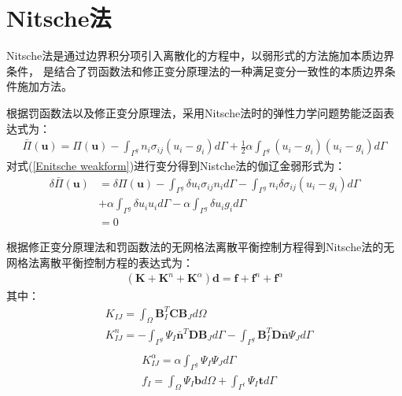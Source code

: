 \section{Nitsche法}
Nitsche法\cite{}是通过边界积分项引入离散化的方程中，以弱形式的方法施加本质边界条件，
是结合了罚函数法和修正变分原理法的一种满足变分一致性的本质边界条件施加方法。\par
根据罚函数法以及修正变分原理法，采用Nitsche法时的弹性力学问题势能泛函表达式为：
\begin{equation}\label{Enitsche weakform}
\begin{split}
    \bar{\Pi}(\pmb{u})=\Pi(\pmb{u})-\int_{\Gamma^g}n_i\sigma_{ij}(u_i-g_i)d\Gamma+\frac{1}{2}\alpha\int_{\Gamma^g}(u_i-g_i)(u_i-g_i)d\Gamma
\end{split}
\end{equation}
对式(\ref{Enitsche weakform})进行变分得到Nistche法的伽辽金弱形式为：
\begin{equation}
\begin{split}
    \delta\bar{\Pi}(\pmb{u})&=\delta\Pi(\pmb{u})-\int_{\Gamma^g}\delta u_i\sigma_{ij}n_id\Gamma-\int_{\Gamma^g}n_i\delta\sigma_{ij}(u_i-g_i)d\Gamma\\
&+\alpha\int_{\Gamma^g}\delta u_iu_id\Gamma-\alpha\int_{\Gamma^g}\delta u_i g_id\Gamma\\
&=0
\end{split}
\end{equation}\par
根据修正变分原理法和罚函数法的无网格法离散平衡控制方程得到Nitsche法的无网格法离散平衡控制方程的表达式为：
\begin{equation}
\begin{split}
    (\pmb{K}+\pmb{K}^n+\pmb{K}^{\alpha})\pmb{d}=\pmb{f}+\pmb{f}^n+\pmb{f}^{\alpha}
\end{split}
\end{equation}
其中：
\begin{equation}
\begin{split}
   &K_{IJ}=\int_{\Omega}\pmb{B}_I^T\pmb{C}\pmb{B}_Jd\Omega\\
   &K^n_{IJ}=-\int_{\Gamma^g}\Psi_I\bar{\pmb{n}}^T\pmb{D}\pmb{B}_Jd\Gamma-\int_{\Gamma^g}\pmb{B}_I^T\pmb{D}\bar{\pmb{n}}\Psi_Jd\Gamma\\
\end{split}
\end{equation}
\begin{equation}
\begin{split}   
   &K^{\alpha}_{IJ}=\alpha\int_{\Gamma^g}\Psi_I\Psi_Jd\Gamma\\
   &f_I=\int_{\Omega}\Psi_I\pmb{b}d\Omega+\int_{\Gamma^t}\Psi_I\pmb{t}d\Gamma\\
\end{split}
\end{equation}
